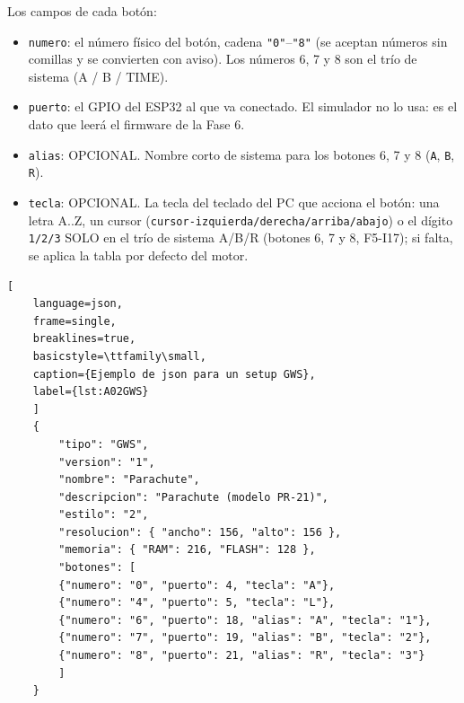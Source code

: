 Los campos de cada botón:

\begin{itemize}
	\item \texttt{numero}: el número físico del botón, cadena
	\texttt{"0"}--\texttt{"8"} (se aceptan números sin comillas y se
	convierten con aviso). Los números 6, 7 y 8 son el trío de sistema
	(A / B / TIME).
	\item \texttt{puerto}: el GPIO del ESP32 al que va conectado. El
	simulador no lo usa: es el dato que leerá el firmware de la Fase 6.
	\item \texttt{alias}: OPCIONAL. Nombre corto de sistema para los
	botones 6, 7 y 8 (\texttt{A}, \texttt{B}, \texttt{R}).
	\item \texttt{tecla}: OPCIONAL. La tecla del teclado del PC que
	acciona el botón: una letra A..Z, un cursor
	(\texttt{cursor-izquierda/derecha/arriba/abajo}) o el dígito
	\texttt{1/2/3} SOLO en el trío de sistema A/B/R (botones 6, 7 y 8,
	F5-I17); si falta, se aplica la tabla por defecto del
	motor.
\end{itemize}

\begin{lstlisting}[
	language=json, 
	frame=single, 
	breaklines=true, 
	basicstyle=\ttfamily\small,
	caption={Ejemplo de json para un setup GWS},
	label={lst:A02GWS}
	]
	{
		"tipo": "GWS",
		"version": "1",
		"nombre": "Parachute",
		"descripcion": "Parachute (modelo PR-21)",
		"estilo": "2",
		"resolucion": { "ancho": 156, "alto": 156 },
		"memoria": { "RAM": 216, "FLASH": 128 },
		"botones": [
		{"numero": "0", "puerto": 4, "tecla": "A"},
		{"numero": "4", "puerto": 5, "tecla": "L"},
		{"numero": "6", "puerto": 18, "alias": "A", "tecla": "1"},
		{"numero": "7", "puerto": 19, "alias": "B", "tecla": "2"},
		{"numero": "8", "puerto": 21, "alias": "R", "tecla": "3"}
		]
	}
\end{lstlisting}
